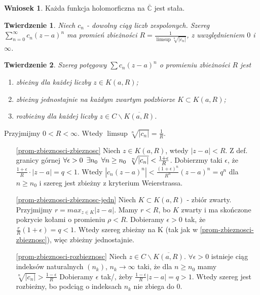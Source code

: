 \documentclass[11pt]{article}
\newcommand{\abs}[1]{\left|#1\right|} %
\newcommand{\closure}[1]{\overline{#1}} %
\newcommand{\extcomplex}{\overline{\mathbb{C}}} %
\theoremstyle{plain}
\newtheorem*{theorem}{Twierdzenie}
\theoremstyle{definition}
\newtheorem*{corollary}{Wniosek}
\theoremstyle{remark}
\let\oldendproof\endproof
\renewenvironment{proof}[1][\proofname]{
  \oldproof[\textsc{\small #1}]
}{\oldendproof}
\begin{document}
\begin{corollary}
  Każda funkcja holomorficzna na $ \extcomplex $ jest stała.
\end{corollary}

\begin{theorem}
  Niech $ c_{n} $ - dowolny ciąg liczb zespolonych. Szereg $ \sum_{n=0}^{\infty} c_{n}(z-a)^{n} $ ma promień zbieżności $ R = \frac{1}{\limsup \sqrt[n]{\abs{c_{n}}}} $, z uwzględnieniem $ 0 $ i $ \infty $.
\end{theorem}

\begin{theorem}
  Szereg potęgowy $ \sum c_{n}(z-a)^{n} $ o promieniu zbieżności $ R $ jest 
  \begin{enumerate}
    \item zbieżny dla każdej liczby $ z \in K(a, R) $; \label{prom-zbieznosci-zbieznosc}
    \item zbieżny jednostajnie na każdym zwartym podzbiorze $ K \subset K(a, R) $; \label{prom-zbieznosci-zbieznosc-jedn}
    \item rozbieżny dla każdej liczby $ z \in C \backslash \closure{K(a, R)} $. \label{prom-zbieznosci-rozbieznosc}
  \end{enumerate}
\end{theorem}

\begin{proof}
  Przyjmijmy $ 0 < R < \infty $. Wtedy $ \limsup \sqrt[n]{\abs{c_n}} = \frac{1}{R} $.

  \begin{enumerate}
    \item[\ref{prom-zbieznosci-zbieznosc}]
    Niech $ z \in K(a, R) $, wtedy $ \abs{z-a} < R $. Z def. granicy górnej 
    $ \forall \epsilon > 0 \enskip \exists n_0 \enskip \forall n \geq n_0 \enskip \sqrt[n]{\abs{c_n}} < \frac{1+\epsilon}{R} $.
    Dobierzmy taki $ \epsilon $, że $ \frac{1+\epsilon}{R} \cdot \abs{z-a} = q < 1 $.
    Wtedy $ \abs{ c_n(z-a)^n } < \frac{(1+\epsilon)^n}{R^n}(z-a)^n = q^n $ dla $ n \geq n_0 $ i szereg jest zbieżny z kryterium Weierstrassa.

    \item[\ref{prom-zbieznosci-zbieznosc-jedn}]
    Niech $ K \subset K(a, R) $ - zbiór zwarty.
    Przyjmijmy $ r = max_{z \in K}\abs{z-a} $.
    Mamy $ r < R $, bo $ K $ zwarty i ma skończone pokrycie kołami o promieniu $ \rho < R $.
    Dobieramy $ \epsilon > 0 $ tak, że $ \frac{r}{R}(1+\epsilon) = q < 1 $.
    Wtedy szereg zbieżny na K (tak jak w \ref{prom-zbieznosci-zbieznosc}), więc zbieżny jednostajnie.

    \item[\ref{prom-zbieznosci-rozbieznosc}]
    Niech $ z \in C \backslash \closure{K(a, R)} $.
    $ \forall \epsilon > 0 $ istnieje ciąg indeksów naturalnych $ (n_k) $, $ n_k \to \infty $ taki, że dla $ n \geq n_0 $ mamy $ \sqrt[n]{\abs{c_n}} > \frac{1-\epsilon}{R} $
    Dobieramy $ \epsilon $ tak/, żeby $ \frac{1-\epsilon}{R}\abs{z-a} = q > 1 $.
    Wtedy szereg jest rozbieżny, bo podciąg o indeksach $ n_k $ nie zbiega do $ 0 $.
  \end{enumerate}
\end{proof}
\end{document}
